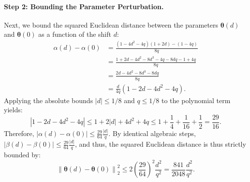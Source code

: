 \documentclass{article}
\theoremstyle{plain}
\theoremstyle{definition}
\theoremstyle{plain}
\newcommand{\bignorm}[1]{\left\lVert #1 \right\rVert}
\begin{document}
\paragraph{Step 2: Bounding the Parameter Perturbation.}
Next, we bound the squared Euclidean distance between the parameters $\bm\theta(d)$ and $\bm\theta(0)$ as a function of the shift $d$:
\begin{align}
    \alpha(d) - \alpha(0) &= \frac{(1 - 4 d^2 - 4 q)(1 + 2d) - (1 - 4 q)}{8 q} \\
    &= \frac{1 + 2d - 4 d^2 - 8 d^3 - 4 q - 8 d q - 1 + 4 q}{8 q} \\
    &= \frac{2d - 4 d^2 - 8 d^3 - 8 d q}{8 q} \\
    &= \frac{d}{4 q} (1 - 2d - 4 d^2 - 4 q).
\end{align}
Applying the absolute bounds $|d| \leq 1/8$ and $q \leq 1/8$ to the polynomial term yields:
\begin{equation}
    |1 - 2d - 4 d^2 - 4 q| \leq 1 + 2|d| + 4 d^2 + 4 q \leq 1 + \frac{1}{4} + \frac{1}{16} + \frac{1}{2} = \frac{29}{16}.
\end{equation}
Therefore, $|\alpha(d) - \alpha(0)| \leq \frac{29}{64} \frac{|d|}{q}$. By identical algebraic steps, $|\beta(d) - \beta(0)| \leq \frac{29}{64} \frac{|d|}{q}$, and thus, the squared Euclidean distance is thus strictly bounded by:
\begin{equation}
    \bignorm{\bm\theta(d) - \bm\theta(0)}_2^2 \leq 2 \left( \frac{29}{64} \right)^2 \frac{d^2}{q^2} = \frac{841}{2048} \frac{d^2}{q^2}.
\end{equation}
\end{document}
